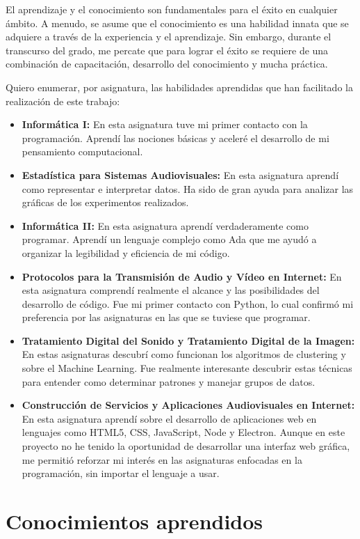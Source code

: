 \documentclass[a4paper, 12pt]{book}
\begin{document}
El aprendizaje y el conocimiento son fundamentales para el éxito en cualquier ámbito. A menudo, se asume que el conocimiento es una habilidad innata que se adquiere a través de la experiencia y el aprendizaje. Sin embargo, durante el transcurso del grado, me percate que para lograr el éxito se requiere de una combinación de capacitación, desarrollo del conocimiento y mucha práctica.

Quiero enumerar, por asignatura, las habilidades aprendidas que han facilitado la realización de este trabajo:

\begin{itemize}
\item \textbf{Informática I:} En esta asignatura tuve mi primer contacto con la programación. Aprendí las nociones básicas y aceleré el desarrollo de mi pensamiento computacional.
\item \textbf{Estadística para Sistemas Audiovisuales:} En esta asignatura aprendí como representar e interpretar datos. Ha sido de gran ayuda para analizar las gráficas de los experimentos realizados.
\item \textbf{Informática II:} En esta asignatura aprendí verdaderamente como programar. Aprendí un lenguaje complejo como Ada que me ayudó a organizar la legibilidad y eficiencia de mi código. 
\item \textbf{Protocolos para la Transmisión de Audio y Vídeo en Internet:} En esta asignatura comprendí realmente el alcance y las posibilidades del desarrollo de código. Fue mi primer contacto con Python, lo cual confirmó mi preferencia por las asignaturas en las que se tuviese que programar.
\item \textbf{Tratamiento Digital del Sonido y Tratamiento Digital de la Imagen:} En estas asignaturas descubrí como funcionan los algoritmos de clustering y sobre el Machine Learning. Fue realmente interesante descubrir estas técnicas para entender como determinar patrones y manejar grupos de datos.
\item \textbf{Construcción de Servicios y Aplicaciones Audiovisuales en Internet:} En esta asignatura aprendí sobre el desarrollo de aplicaciones web en lenguajes como HTML5, CSS, JavaScript, Node y Electron. Aunque en este proyecto no he tenido la oportunidad de desarrollar una interfaz web gráfica, me permitió reforzar mi interés en las asignaturas enfocadas en la programación, sin importar el lenguaje a usar.
\end{itemize}

\section{Conocimientos aprendidos}
\label{sec:aprendizaje}
\end{document}
